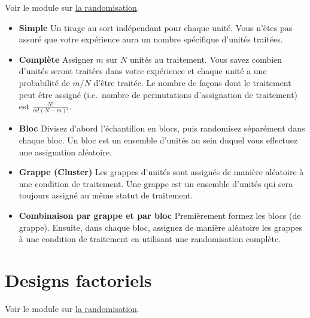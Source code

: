 \documentclass[
  12pt,
]{book}
\begin{document}
Voir le module sur \href{randomization.html}{la randomisation}.

\begin{itemize}
\item
  \textbf{Simple} Un tirage au sort indépendant pour chaque unité. Vous n'êtes pas assuré que votre expérience aura un nombre spécifique d'unités traitées.
\item
  \textbf{Complète} Assigner \(m\) sur \(N\) unités au traitement. Vous savez combien d'unités seront traitées dans votre expérience et chaque unité a une probabilité de \(m/N\) d'être traitée. Le nombre de façons dont le traitement peut être assigné (i.e.~nombre de permutations d'assignation de traitement) est \(\frac{N!}{m!(N-m)!}\).
\item
  \textbf{Bloc} Divisez d'abord l'échantillon en blocs, puis randomisez séparément dans chaque bloc. Un bloc est un ensemble d'unités au sein duquel vous effectuez une assignation aléatoire.
\item
  \textbf{Grappe (Cluster)} Les grappes d'unités sont assignés de manière aléatoire à une condition de traitement. Une grappe est un ensemble d'unités qui sera toujours assigné au même statut de traitement.
\item
  \textbf{Combinaison par grappe et par bloc} Premièrement formez les blocs (de grappe). Ensuite, dans chaque bloc, assignez de manière aléatoire les grappes à une condition de traitement en utilisant une randomisation complète.
\end{itemize}

\hypertarget{designs-factoriels}{%
\section{Designs factoriels}\label{designs-factoriels}}

Voir le module sur \href{randomization.html}{la randomisation}.
\end{document}
